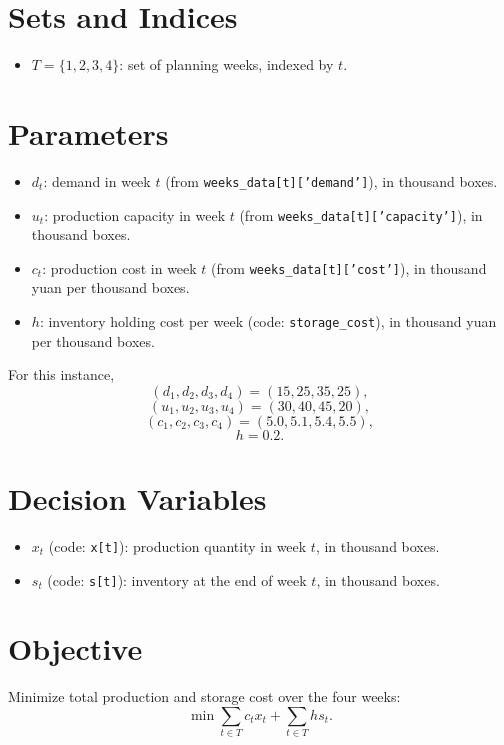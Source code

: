 \section*{Sets and Indices}

\begin{itemize}
    \item $T = \{1,2,3,4\}$: set of planning weeks, indexed by $t$.
\end{itemize}

\section*{Parameters}

\begin{itemize}
    \item $d_t$: demand in week $t$ (from \texttt{weeks\_data[t]['demand']}), in thousand boxes.
    \item $u_t$: production capacity in week $t$ (from \texttt{weeks\_data[t]['capacity']}), in thousand boxes.
    \item $c_t$: production cost in week $t$ (from \texttt{weeks\_data[t]['cost']}), in thousand yuan per thousand boxes.
    \item $h$: inventory holding cost per week (code: \texttt{storage\_cost}), in thousand yuan per thousand boxes.
\end{itemize}

For this instance,
\[
(d_1,d_2,d_3,d_4) = (15,25,35,25),
\]
\[
(u_1,u_2,u_3,u_4) = (30,40,45,20),
\]
\[
(c_1,c_2,c_3,c_4) = (5.0,5.1,5.4,5.5),
\]
\[
h = 0.2.
\]

\section*{Decision Variables}

\begin{itemize}
    \item $x_t$ (code: \texttt{x[t]}): production quantity in week $t$, in thousand boxes.
    \item $s_t$ (code: \texttt{s[t]}): inventory at the end of week $t$, in thousand boxes.
\end{itemize}

\section*{Objective}

Minimize total production and storage cost over the four weeks:
\[
\min \sum_{t \in T} c_t x_t + \sum_{t \in T} h s_t.
\]

